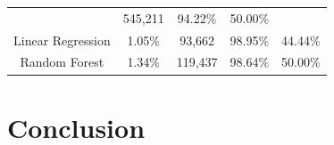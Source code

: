 \documentclass[12pt,oneside]{chicagocapstone}
\begin{document}
\begin{longtable}[]{@{}ccccc@{}}
\begin{minipage}[t]{0.13\columnwidth}
\end{minipage} & \begin{minipage}[t]{0.14\columnwidth}\centering\strut
545,211\strut
\end{minipage} & \begin{minipage}[t]{0.16\columnwidth}\centering\strut
94.22\%\strut
\end{minipage} & \begin{minipage}[t]{0.16\columnwidth}\centering\strut
50.00\%\strut
\end{minipage}\tabularnewline
\begin{minipage}[t]{0.27\columnwidth}\centering\strut
Linear Regression\strut
\end{minipage} & \begin{minipage}[t]{0.13\columnwidth}\centering\strut
1.05\%\strut
\end{minipage} & \begin{minipage}[t]{0.14\columnwidth}\centering\strut
93,662\strut
\end{minipage} & \begin{minipage}[t]{0.16\columnwidth}\centering\strut
98.95\%\strut
\end{minipage} & \begin{minipage}[t]{0.16\columnwidth}\centering\strut
44.44\%\strut
\end{minipage}\tabularnewline
\begin{minipage}[t]{0.27\columnwidth}\centering\strut
Random Forest\strut
\end{minipage} & \begin{minipage}[t]{0.13\columnwidth}\centering\strut
1.34\%\strut
\end{minipage} & \begin{minipage}[t]{0.14\columnwidth}\centering\strut
119,437\strut
\end{minipage} & \begin{minipage}[t]{0.16\columnwidth}\centering\strut
98.64\%\strut
\end{minipage} & \begin{minipage}[t]{0.16\columnwidth}\centering\strut
50.00\%\strut
\end{minipage}\tabularnewline
\bottomrule
\end{longtable}
\chapter*{Conclusion}\label{conclusion}
\end{document}
